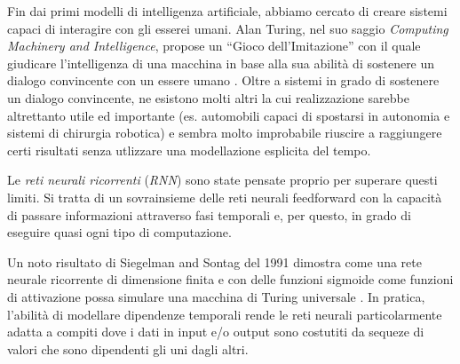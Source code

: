 Fin dai primi modelli di intelligenza artificiale, abbiamo cercato di creare sistemi capaci di interagire con gli esserei umani.
Alan Turing, nel suo saggio \emph{Computing Machinery and Intelligence}, propose un ``Gioco dell'Imitazione'' con il quale giudicare l'intelligenza di una macchina in base alla sua abilit\`a di sostenere un dialogo convincente con un essere umano \cite{Turing:1950}.
Oltre a sistemi in grado di sostenere un dialogo convincente, ne esistono molti altri la cui realizzazione sarebbe altrettanto utile ed importante (es. automobili capaci di spostarsi in autonomia e sistemi di chirurgia robotica) e sembra molto improbabile riuscire a raggiungere certi risultati senza utlizzare una modellazione esplicita del tempo.

Le \emph{reti neurali ricorrenti} (\emph{RNN}) sono state pensate proprio per superare questi limiti.
Si tratta di un sovrainsieme delle reti neurali feedforward con la capacit\`a di passare informazioni attraverso fasi temporali e, per questo, in grado di eseguire quasi ogni tipo di computazione.

Un noto risultato di Siegelman and Sontag del 1991 dimostra come una rete neurale ricorrente di dimensione finita e con delle funzioni sigmoide come funzioni di attivazione possa simulare una macchina di Turing universale \cite{Siegelmann:1991}.
In pratica, l'abilit\`a di modellare dipendenze temporali rende le reti neurali particolarmente adatta a compiti dove i dati in input e/o output sono costutiti da sequeze di valori che sono dipendenti gli uni dagli altri.


